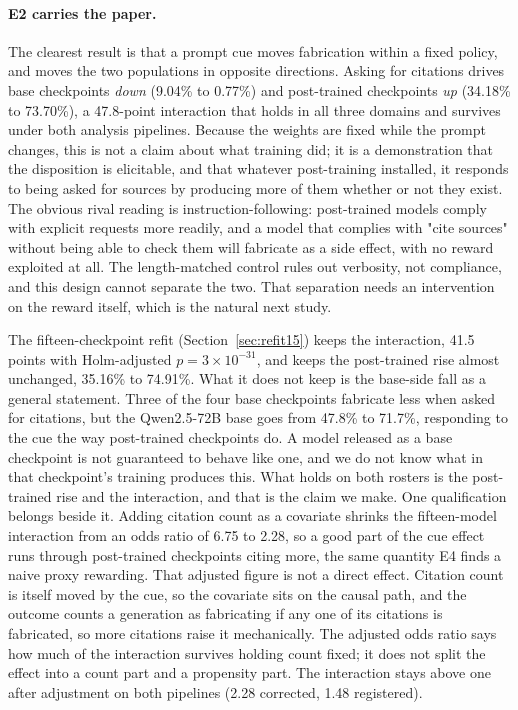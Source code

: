 \paragraph{E2 carries the paper.}
The clearest result is that a prompt cue moves fabrication within a fixed policy,
and moves the two populations in opposite directions. Asking for citations drives
base checkpoints \emph{down} (9.04\% to 0.77\%) and post-trained checkpoints
\emph{up} (34.18\% to 73.70\%), a 47.8-point interaction that holds in all three
domains and survives under both analysis pipelines. Because the weights are fixed
while the prompt changes, this is not a claim about what training did; it is a
demonstration that the disposition is elicitable, and that whatever post-training
installed, it responds to being asked for sources by producing more of them
whether or not they exist. The obvious rival reading is instruction-following:
post-trained models comply with explicit requests more readily, and a model that
complies with "cite sources" without being able to check them will fabricate as
a side effect, with no reward exploited at all. The length-matched control rules
out verbosity, not compliance, and this design cannot separate the two. That
separation needs an intervention on the reward itself, which is the natural next
study.

The fifteen-checkpoint refit (Section~\ref{sec:refit15}) keeps the interaction,
41.5 points with Holm-adjusted $p = 3 \times 10^{-31}$, and keeps the post-trained
rise almost unchanged, 35.16\% to 74.91\%. What it does not keep is the base-side
fall as a general statement. Three of the four base checkpoints fabricate less
when asked for citations, but the Qwen2.5-72B base goes from 47.8\% to 71.7\%,
responding to the cue the way post-trained checkpoints do. A model released as a
base checkpoint is not guaranteed to behave like one, and we do not know what in
that checkpoint's training produces this. What holds on both rosters is the
post-trained rise and the interaction, and that is the claim we make. One
qualification belongs beside it. Adding citation count as a covariate shrinks
the fifteen-model interaction from an odds ratio of 6.75 to 2.28, so a good part
of the cue effect runs through post-trained checkpoints citing more, the same
quantity E4 finds a naive proxy rewarding. That adjusted figure is not a direct
effect. Citation count is itself moved by the cue, so the covariate sits on the
causal path, and the outcome counts a generation as fabricating if any one of its
citations is fabricated, so more citations raise it mechanically. The adjusted
odds ratio says how much of the interaction survives holding count fixed; it does
not split the effect into a count part and a propensity part. The interaction
stays above one after adjustment on both pipelines (2.28 corrected, 1.48
registered).


